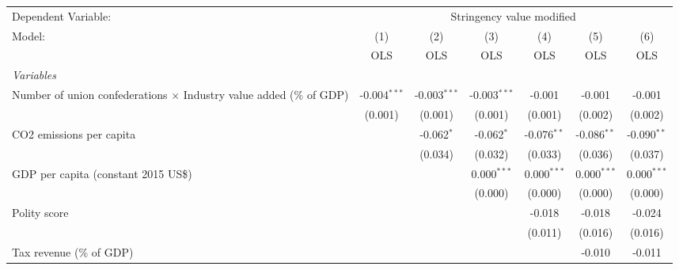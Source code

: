 
\begingroup
\centering
\begin{tabular}{lcccccc}
   \toprule
   Dependent Variable: & \multicolumn{6}{c}{Stringency value modified}\\
   Model:                                                                     & (1)            & (2)            & (3)            & (4)           & (5)           & (6)\\  
                                                                              &  OLS           & OLS            & OLS            & OLS           & OLS           & OLS\\  
   \midrule
   \emph{Variables}\\
   Number of union confederations $\times$ Industry value added (\% of GDP)   & -0.004$^{***}$ & -0.003$^{***}$ & -0.003$^{***}$ & -0.001        & -0.001        & -0.001\\   
                                                                              & (0.001)        & (0.001)        & (0.001)        & (0.001)       & (0.002)       & (0.002)\\   
   CO2 emissions per capita                                                   &                & -0.062$^{*}$   & -0.062$^{*}$   & -0.076$^{**}$ & -0.086$^{**}$ & -0.090$^{**}$\\   
                                                                              &                & (0.034)        & (0.032)        & (0.033)       & (0.036)       & (0.037)\\   
   GDP per capita (constant 2015 US\$)                                        &                &                & 0.000$^{***}$  & 0.000$^{***}$ & 0.000$^{***}$ & 0.000$^{***}$\\   
                                                                              &                &                & (0.000)        & (0.000)       & (0.000)       & (0.000)\\   
   Polity score                                                               &                &                &                & -0.018        & -0.018        & -0.024\\   
                                                                              &                &                &                & (0.011)       & (0.016)       & (0.016)\\   
   Tax revenue (\% of GDP)                                                    &                &                &                &               & -0.010        & -0.011\\   

\end{tabular}
